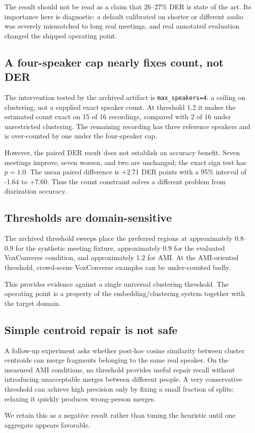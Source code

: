 The result should not be read as a claim that 26--27\% DER is state of the art. Its importance
here is diagnostic: a default calibrated on shorter or different audio was severely mismatched
to long real meetings, and real annotated evaluation changed the shipped operating point.

\subsection{A four-speaker cap nearly fixes count, not DER}

The intervention tested by the archived artifact is \texttt{max\_speakers=4}: a ceiling on
clustering, not a supplied exact speaker count. At threshold 1.2 it makes the estimated count
exact on 15 of 16 recordings, compared with 2 of 16 under unrestricted clustering. The remaining
recording has three reference speakers and is over-counted by one under the four-speaker cap.

However, the paired DER result does not establish an accuracy benefit. Seven meetings improve,
seven worsen, and two are unchanged; the exact sign test has $p=1.0$. The mean paired difference
is +2.71 DER points with a 95\% interval of -1.64 to +7.60. Thus the count constraint solves a
different problem from diarization accuracy.

\subsection{Thresholds are domain-sensitive}

The archived threshold sweeps place the preferred regions at approximately 0.8--0.9 for the
synthetic meeting fixture, approximately 0.9 for the evaluated VoxConverse condition, and
approximately 1.2 for AMI. At the AMI-oriented threshold, crowd-scene VoxConverse examples can
be under-counted badly.

This provides evidence against a single universal clustering threshold. The operating point is a
property of the embedding/clustering system together with the target domain.

\subsection{Simple centroid repair is not safe}

A follow-up experiment asks whether post-hoc cosine similarity between cluster centroids can merge
fragments belonging to the same real speaker. On the measured AMI conditions, no threshold
provides useful repair recall without introducing unacceptable merges between different people.
A very conservative threshold can achieve high precision only by fixing a small fraction of
splits; relaxing it quickly produces wrong-person merges.

We retain this as a negative result rather than tuning the heuristic until one aggregate appears
favorable.